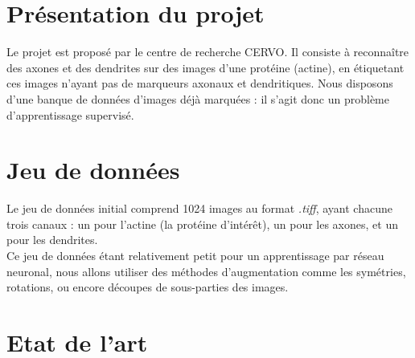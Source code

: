 \documentclass{report}
\begin{document}
\section{Présentation du projet}

Le projet est proposé par le centre de recherche CERVO.  Il consiste à reconnaître
des axones et des dendrites sur des images d’une protéine (actine), en étiquetant ces images
n’ayant pas de marqueurs axonaux et dendritiques. Nous disposons d’une banque de
données d’images déjà marquées : il s'agit donc un problème d’apprentissage supervisé.

\section{Jeu de données}

Le jeu de données initial comprend 1024 images au format \textit{.tiff}, ayant
chacune trois canaux : un pour l'actine (la protéine d'intérêt), un pour les axones,
et un pour les dendrites. \\
Ce jeu de données étant relativement petit pour un apprentissage par réseau neuronal,
nous allons utiliser des méthodes d'augmentation comme les symétries, rotations, ou
encore découpes de sous-parties des images.

\section{Etat de l'art}
\end{document}

